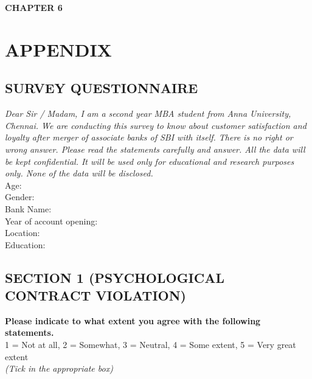 \documentclass[a4paper, 12pt]{extarticle}
\begin{document}
{%

\newpage
\begin{center}
\textbf{\large CHAPTER 6}
\end{center}
\section{APPENDIX}
\subsection{SURVEY QUESTIONNAIRE}
\emph{Dear Sir / Madam, I am a second year MBA student from Anna University, Chennai. We are conducting this survey to know about customer satisfaction and loyalty after merger of associate banks of SBI with itself. There is no right or wrong answer. Please read the statements carefully and answer. All the data will be kept confidential. It will be used only for educational and research purposes only. None of the data will be disclosed.}\\
\noindent\makebox[\linewidth]{\rule{\paperwidth}{0.4pt}}
Age:\\
Gender:\\
Bank Name:\\
Year of account opening:\\
Location:\\
Education:\\
\noindent\makebox[\linewidth]{\rule{\paperwidth}{0.4pt}}

\subsection*{SECTION 1 (PSYCHOLOGICAL CONTRACT VIOLATION)}
\textbf{Please indicate to what extent you agree with the following statements.} \\
1 = Not at all, 2 = Somewhat, 3 = Neutral, 4 = Some extent, 5 = Very great extent\\
\emph {(Tick in the appropriate box)}\\
\begin{minipage}{\textwidth}


\end{minipage}}
\end{document}
